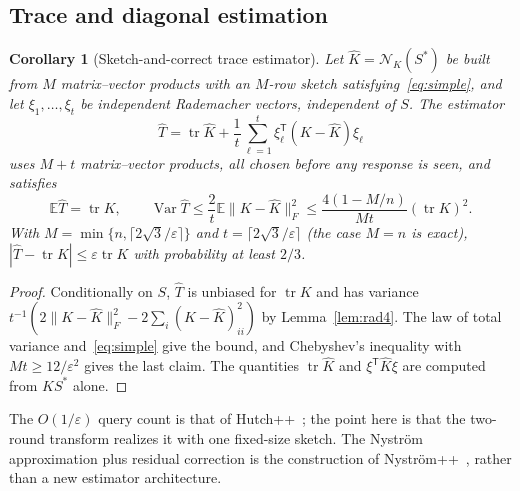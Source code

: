 \documentclass[11pt,a4paper]{article}
\newtheorem{corollary}[theorem]{Corollary}
\theoremstyle{definition}
\theoremstyle{remark}
\numberwithin{equation}{section}
\newcommand{\E}{\mathbb E}
\newcommand{\tr}{\operatorname{tr}}
\newcommand{\Var}{\operatorname{Var}}
\newcommand{\eps}{\varepsilon}
\newcommand{\norm}[1]{\lVert#1\rVert}
\newcommand{\Nys}{\mathcal N}
\begin{document}
\subsection{Trace and diagonal estimation}

\begin{corollary}[Sketch-and-correct trace estimator]\label{cor:trace}
Let $\widehat K=\Nys_K(S^*)$ be built from $M$ matrix--vector products with an
$M$-row sketch satisfying~\eqref{eq:simple}, and let $\xi_1,\dots,\xi_t$ be
independent Rademacher vectors, independent of $S$. The estimator
\[
 \widehat T=\tr\widehat K+\frac1t\sum_{\ell=1}^t\xi_\ell^{\mathsf T}(K-\widehat K)\xi_\ell
\]
uses $M+t$ matrix--vector products, all chosen before any response is seen, and
satisfies
\[
 \E\widehat T=\tr K,\qquad \Var\widehat T\le\frac2t\E\norm{K-\widehat K}_F^2
 \le\frac{4(1-M/n)}{Mt}(\tr K)^2 .
\]
With $M=\min\{n,\lceil2\sqrt3/\eps\rceil\}$ and
$t=\lceil2\sqrt3/\eps\rceil$ (the case $M=n$ is exact), $|\widehat T-\tr K|\le\eps\tr K$
with probability at least $2/3$.
\end{corollary}
\begin{proof}
Conditionally on $S$, $\widehat T$ is unbiased for $\tr K$ and has variance
$t^{-1}(2\norm{K-\widehat K}_F^2-2\sum_i(K-\widehat K)_{ii}^2)$ by
Lemma~\ref{lem:rad4}. The law of total variance and~\eqref{eq:simple} give the
bound, and Chebyshev's inequality with $Mt\ge12/\eps^2$ gives the last claim.
The quantities $\tr\widehat K$ and $\xi^{\mathsf T}\widehat K\xi$ are computed
from $KS^*$ alone.
\end{proof}
The $O(1/\eps)$ query count is that of Hutch++~\cite{Hutchpp}; the point here
is that the two-round transform realizes it with one fixed-size sketch.
The Nystr\"om approximation plus residual correction is the construction
of Nystr\"om++~\cite{Nystrompp}, rather than a new estimator architecture.
\end{document}

